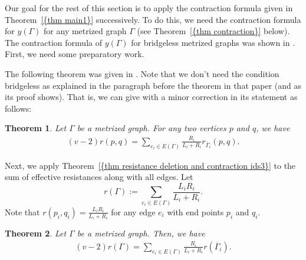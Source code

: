 \documentclass[12pt]{amsart}
\newtheorem{theorem}{Theorem}[section]
\theoremstyle{example}
\theoremstyle{definition}
\theoremstyle{notation}
\begin{document}
Our goal for the rest of this section is to apply the contraction formula given in {Theorem~\ref{{thm main1}}} successively. To do this, we need the contraction formula for $y({\Gamma})$ for any metrized graph ${\Gamma}$ (see {Theorem~\ref{{thm contraction}}} below).  The contraction formula of $y({\Gamma})$ for bridgeless metrized graphs was shown in \cite[Theorem 4.12]{C5}. First, we need some preparatory work.

The following theorem was given in \cite[Theorem 4.8]{C6}. Note that we don't need the condition bridgeless as explained in the paragraph before the theorem in that paper (and as its proof shows). That is, we can give \cite[Theorem 4.8]{C6} with a minor correction in its statement as follows:
\begin{theorem}\label{thm resistance deletion and contraction ids3}
Let ${\Gamma}$ be a metrized graph. For any two vertices $p$ and $q$, we have
\begin{equation*}\label{eqn contraction general}
\begin{split}
(v-2) r(p,q)= \sum_{e_i \in {E({\Gamma})}} \frac{R_{i}}{{L_{i}}+{R_{i}}} r_{{{\overline{\Gamma}}}_i}(p,q).
\end{split}
\end{equation*}
\end{theorem}
Next, we apply {Theorem~\ref{{thm resistance deletion and contraction ids3}}} to the sum of effective resistances along with all edges.
Let $$r({\Gamma}):=\sum_{e_i \in {E({\Gamma})}}\frac{{L_{i}} {R_{i}}}{{L_{i}}+{R_{i}}}.$$
Note that $r({p_{i}},{q_{i}})=\frac{{L_{i}} {R_{i}}}{{L_{i}}+{R_{i}}}$ for any edge $e_i$ with end points ${p_{i}}$ and ${q_{i}}$.
\begin{theorem}\label{thm contraction for r}
Let ${\Gamma}$ be a metrized graph. Then, we have
\begin{equation*}\label{eqn contraction for r}
\begin{split}
(v-2) r({\Gamma})= \sum_{e_i \in {E({\Gamma})}} \frac{R_{i}}{{L_{i}}+{R_{i}}} r({{\overline{\Gamma}}}_i).
\end{split}
\end{equation*}
\end{theorem}
\end{document}
